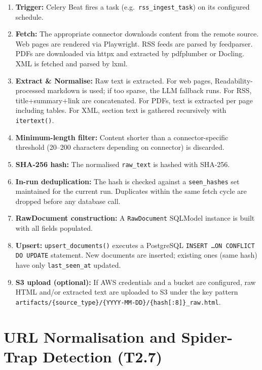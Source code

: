 \documentclass[12pt,a4paper]{article}
\begin{document}
\begin{enumerate}[leftmargin=*, noitemsep]
  \item \textbf{Trigger:} Celery Beat fires a task (e.g.\ \texttt{rss\_ingest\_task}) on its configured schedule.
  \item \textbf{Fetch:} The appropriate connector downloads content from the remote source. Web pages are rendered via Playwright. RSS feeds are parsed by feedparser. PDFs are downloaded via httpx and extracted by pdfplumber or Docling. XML is fetched and parsed by lxml.
  \item \textbf{Extract \& Normalise:} Raw text is extracted. For web pages, Readability-processed markdown is used; if too sparse, the LLM fallback runs. For RSS, title+summary+link are concatenated. For PDFs, text is extracted per page including tables. For XML, section text is gathered recursively with \texttt{itertext()}.
  \item \textbf{Minimum-length filter:} Content shorter than a connector-specific threshold (20--200 characters depending on connector) is discarded.
  \item \textbf{SHA-256 hash:} The normalised \texttt{raw\_text} is hashed with SHA-256.
  \item \textbf{In-run deduplication:} The hash is checked against a \texttt{seen\_hashes} set maintained for the current run. Duplicates within the same fetch cycle are dropped before any database call.
  \item \textbf{RawDocument construction:} A \texttt{RawDocument} SQLModel instance is built with all fields populated.
  \item \textbf{Upsert:} \texttt{upsert\_documents()} executes a PostgreSQL \texttt{INSERT \ldots ON CONFLICT DO UPDATE} statement. New documents are inserted; existing ones (same hash) have only \texttt{last\_seen\_at} updated.
  \item \textbf{S3 upload (optional):} If AWS credentials and a bucket are configured, raw HTML and/or extracted text are uploaded to S3 under the key pattern \texttt{artifacts/\{source\_type\}/\{YYYY-MM-DD\}/\{hash[:8]\}\_raw.html}.
\end{enumerate}

\section{URL Normalisation and Spider-Trap Detection (T2.7)}
\end{document}
